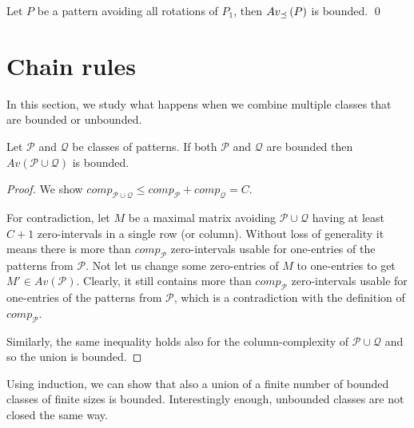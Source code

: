 \begin{thm}
Let $P$ be a pattern avoiding all rotations of $P_1$, then $Av_{\preceq}\left(P\right)$ is bounded. \qed
\end{thm}

\section{Chain rules}
In this section, we study what happens when we combine multiple classes that are bounded or unbounded.

\begin{thm}
\label{thm:boundunion}
Let $\mathcal{P}$ and $\mathcal{Q}$ be classes of patterns. If both $\mathcal{P}$ and $\mathcal{Q}$ are bounded then $Av(\mathcal{P}\cup\mathcal{Q})$ is bounded.
\end{thm}
\begin{proof}
We show $comp_{\mathcal{P}\cup\mathcal{Q}}\leq comp_\mathcal{P}+comp_\mathcal{Q}=C$.

For contradiction, let $M$ be a maximal matrix avoiding $\mathcal{P}\cup\mathcal{Q}$ having at least $C+1$ zero-intervals in a single row (or column). Without loss of generality it means there is more than $comp_\mathcal{P}$ zero-intervals usable for one-entries of the patterns from $\mathcal{P}$. Not let us change some zero-entries of $M$ to one-entries to get $M'\in Av(\mathcal{P})$. Clearly, it still contains more than $comp_\mathcal{P}$ zero-intervals usable for one-entries of the patterns from $\mathcal{P}$, which is a contradiction with the definition of $comp_\mathcal{P}$.

Similarly, the same inequality holds also for the column-complexity of $\mathcal{P}\cup\mathcal{Q}$ and so the union is bounded.
\end{proof}

Using induction, we can show that also a union of a finite number of bounded classes of finite sizes is bounded. Interestingly enough, unbounded classes are not closed the same way.


